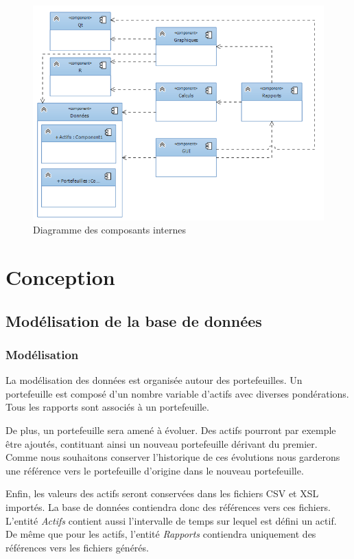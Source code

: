 \documentclass[a4paper]{report}
\begin{document}
\begin{figure}
  	\center
  	\includegraphics[width=1\textwidth]{architecture_generale.png}
  	\caption{Diagramme des composants internes}
  	\label{fig:diagramme-composants}
\end{figure}



\chapter{Conception}

\section{Modélisation de la base de données}

\subsection{Modélisation}

La modélisation des données est organisée autour des portefeuilles.
Un portefeuille est composé d'un nombre variable d'actifs avec diverses pondérations.
Tous les rapports sont associés à un portefeuille.

De plus, un portefeuille sera amené à évoluer.
Des actifs pourront par exemple être ajoutés, contituant ainsi un nouveau portefeuille dérivant du premier.
Comme nous souhaitons conserver l'historique de ces évolutions nous garderons une référence vers le portefeuille d'origine dans le nouveau portefeuille.

Enfin, les valeurs des actifs seront conservées dans les fichiers CSV et XSL importés. 
La base de données contiendra donc des références vers ces fichiers.
L'entité \textit{Actifs} contient aussi l'intervalle de temps sur lequel est défini un actif.
De même que pour les actifs, l'entité \textit{Rapports} contiendra uniquement des références vers les fichiers générés.
\end{document}
